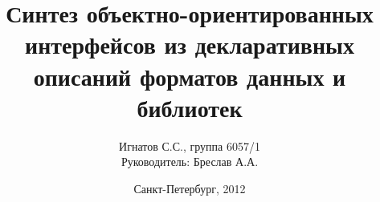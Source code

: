 \documentclass[12pt]{beamer}
\begin{document}
\title{Синтез объектно-ориентированных интерфейсов из декларативных описаний форматов данных и библиотек}


\author{Игнатов С.С., группа 6057/1\\
\vspace{0.3cm}
{\small Руководитель: Бреслав А.А.}}
\date{Санкт-Петербург, 2012}

\frame{\linespread{1}\titlepage}

\end{document}
